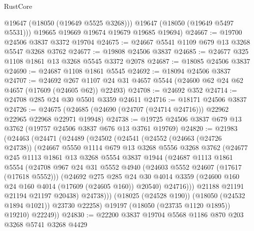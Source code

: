 \begin{lexlean}{RustCore}
\begin{coremodule}
          @19647
          (@18050 (@19649 @5525 @3268)))
        @19647
        (@18050 (@19649 @5497 @5531)))
      @19665
      @19669
      @19674
      @19679
      @19685
      @19694)
@24667 := @19700 @24506 @3837 @3372 @19704
@24675 := @24667 @5541 @1109 @679 @13 @3268 @5547 @3268 @3762
@24677 := @19808 @24506 @3837
@24685 := @24677 @325 @1108 @1861 @13 @3268 @5545 @3372 @2078
@24687 := @18085 @24506 @3837
@24690 := @24687 @1108 @1861 @5545
@24692 := @18094 @24506 @3837
@24707 := @24692
    @267
    @1107
    @24
    @31
    @4657
    @5544
    (@24600 @62 @24 @62 @4657 (@17609 (@24605 @62)) @22493)
@24708 := @24692 @352
@24714 := @24708 @285 @24 @30 @5501 @3359 @24611
@24716 := @18171 @24506 @3837
@24726 := @24675 (@24685 (@24690 (@24707 (@24714 @24716))) @22962 @22965 @22968 @22971 @19948)
@24738 := @19725 @24506 @3837 @679 @13 @3762 (@19757 @24506 @3837 @676 @13 @3761 @19769)
@24820 := @21983
    (@24463
      (@24471
        (@24489
          (@24502
            (@24541
              (@24552
                (@24663 (@24726 @24738))
                (@24667
                  @5550
                  @1114
                  @679
                  @13
                  @3268
                  @5556
                  @3268
                  @3762
                  (@24677
                    @245
                    @1113
                    @1861
                    @13
                    @3268
                    @5554
                    @3837
                    @1944
                    (@24687
                      @1113
                      @1861
                      @5554
                      (@24708
                        @967
                        @24
                        @31
                        @5552
                        @4940
                        (@24603 @5552 @24607 (@17617 (@17618 @5552)))
                        (@24692
                          @275
                          @285
                          @24
                          @30
                          @4014
                          @3359
                          (@24600 @160 @24 @160 @4014 (@17609 (@24605 @160)) @20540)
                          @24716)))
                    @21188
                    @21191
                    @21194
                    @21197
                    @20438)
                  @24738)))
            (@18025 (@24528 @190))
            (@18050 (@24532 @1894 @1021))
            @23730
            @22258)
          @19197
          (@18050 (@23735 @1120 @1895))
          @19210)
        @22249))
@24830 := @22200 @3837 @19704 @5568 @1186 @870 @203 @3268 @5741 @3268 @4429

\end{coremodule}
\end{lexlean}

